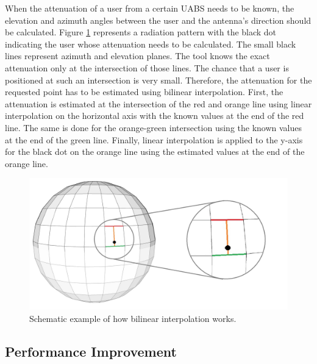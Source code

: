 When the attenuation of a user from a certain \gls{UABS} needs to be known, the elevation and azimuth angles between the user and the antenna's direction 
should be calculated. 
Figure \ref{fig:globe} represents a radiation pattern with the black dot indicating the user whose attenuation needs to be calculated.
The small black lines represent azimuth and elevation planes. 
The tool knows the exact attenuation only at the intersection of those lines. 
The chance that a user is positioned at such an intersection is very small. Therefore, the attenuation for the requested point has to be estimated using bilinear interpolation.
First, the attenuation is estimated at the intersection of the red and orange line using linear interpolation on the horizontal axis with the known values at the end of the red line. 
The same is done for the orange-green intersection using the known values at the end of the green line. Finally, linear interpolation
is applied to the y-axis for the black dot on the orange line using the estimated values at the end of the orange line.

\begin{figure}[H]
\centering
  \includegraphics[width=\textwidth/3*2]{../images/3Dimages/globev2.jpg}
  \caption{Schematic example of how bilinear interpolation works.}
  \label{fig:globe}
\end{figure}

\subsection{Performance Improvement}
